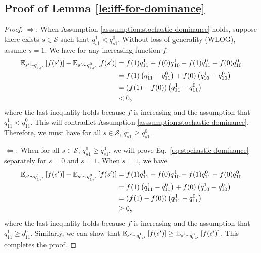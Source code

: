 \subsection{Proof of Lemma \ref{le:iff-for-dominance}}\label{app:stochastic-dominance}
\iffDominance*
\begin{proof}
$\Rightarrow$:
    When Assumption \ref{asssumption:stochastic-dominance} holds, suppose
    there exists $s\in\mathcal{S}$ such that $q_{s1}^1<q_{s1}^0$.
    Without loss of generality (WLOG), assume $s=1$. We have for any increasing function $f$:
    \begin{align*}
        \mathbb{E}_{s'\sim q_{1s'}^1}\left[f(s')\right]-\mathbb{E}_{s'\sim q_{1s'}^0}\left[f(s')\right]
        &=f(1)q^1_{11}+f(0)q^1_{10}-f(1)q^0_{11}-f(0)q^0_{10}\\
        &=f(1)\left(q^1_{11}-q^0_{11}\right)+f(0)\left(q^1_{10}-q^0_{10}\right)\\
        &=\left(f(1)-f(0)\right)\left(q^1_{11}-q^0_{11}\right)\\
        &<0,
    \end{align*}
    where the last inequality holds because $f$ is increasing and the assumption that $q^1_{11}<q^0_{11}$. This will contradict Assumption \ref{asssumption:stochastic-dominance}. Therefore, we must have for all $s\in\mathcal{S}$, $q_{s1}^1\geq q_{s1}^0$.

$\Leftarrow:$  When for all $s\in\mathcal{S}$, $q_{s1}^1\geq q_{s1}^0$, we will prove Eq.~\eqref{eq:stochastic-dominance} separately for $s=0$ and $s=1$.
   When $s=1$,  we have
     \begin{align*}
        \mathbb{E}_{s'\sim q_{1s'}^1}\left[f(s')\right]-\mathbb{E}_{s'\sim q_{1s'}^0}\left[f(s')\right]&=f(1)q^1_{11}+f(0)q^1_{10}-f(1)q^0_{11}-f(0)q^0_{10}\\
        &=f(1)\left(q^1_{11}-q^0_{11}\right)+f(0)\left(q^1_{10}-q^0_{10}\right)\\
        &=\left(f(1)-f(0)\right)\left(q^1_{11}-q^0_{11}\right)\\
        &\geq 0,
    \end{align*}
      where the last inequality holds because $f$ is increasing and the assumption that $q^1_{11}\geq q^0_{11}$. Similarly, we can show that $\mathbb{E}_{s'\sim q_{0s'}^1}\left[f(s')\right]\geq\mathbb{E}_{s'\sim q_{0s'}^0}\left[f(s')\right]$. This completes the proof.
\end{proof}
